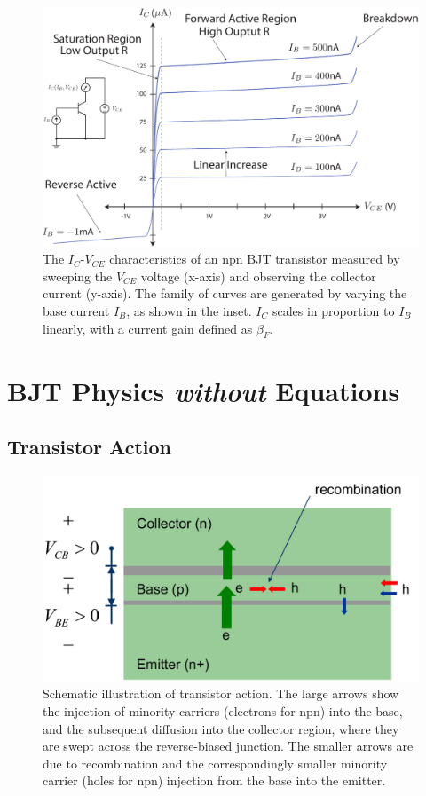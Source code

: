 \begin{figure}[tb]
\begin{center}
\includegraphics[width=.75\columnwidth]{slide7_bjt_ic_vs_ib_curves}
\end{center}
\caption{The $I_C$-$V_{CE}$ characteristics of an npn BJT transistor measured by sweeping the $V_{CE}$ voltage (x-axis) and observing the collector current (y-axis).  The family of curves are generated by varying the base current $I_B$, as shown in the inset.  $I_C$ scales in proportion to $I_B$ linearly, with a current gain defined as $\beta_F$.} \label{fig:slide7_bjt_ic_vs_ib_curves}
\end{figure}









\section{BJT Physics \emph{without} Equations}


\subsection{Transistor Action}

\begin{figure}[tb]
\begin{center}
\includegraphics[width=.65\columnwidth]{slide9_bjt_action}
\end{center}
\caption{Schematic illustration of transistor action.  The large arrows show the injection of minority carriers (electrons for npn) into the base, and the subsequent diffusion into the collector region, where they are swept across the reverse-biased junction.  The smaller arrows are due to recombination and the correspondingly smaller minority carrier (holes for npn) injection from the base into the emitter.} \label{fig:slide9_bjt_action}
\end{figure}

